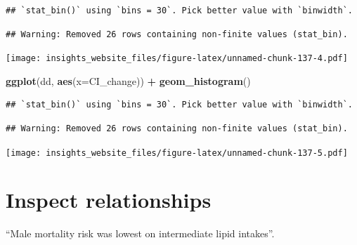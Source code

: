 \documentclass[]{book}
\newenvironment{Shaded}{\begin{snugshade}}{\end{snugshade}}
\newcommand{\DataTypeTok}[1]{\textcolor[rgb]{0.13,0.29,0.53}{#1}}
\newcommand{\DecValTok}[1]{\textcolor[rgb]{0.00,0.00,0.81}{#1}}
\newcommand{\KeywordTok}[1]{\textcolor[rgb]{0.13,0.29,0.53}{\textbf{#1}}}
\newcommand{\NormalTok}[1]{#1}
\newcommand{\OperatorTok}[1]{\textcolor[rgb]{0.81,0.36,0.00}{\textbf{#1}}}
\newcommand{\StringTok}[1]{\textcolor[rgb]{0.31,0.60,0.02}{#1}}
\begin{document}
\begin{verbatim}
## `stat_bin()` using `bins = 30`. Pick better value with `binwidth`.
\end{verbatim}

\begin{verbatim}
## Warning: Removed 26 rows containing non-finite values (stat_bin).
\end{verbatim}

\texttt{[image: insights\_website\_files/figure-latex/unnamed-chunk-137-4.pdf]}

\begin{Shaded}
\begin{Highlighting}[]
\KeywordTok{ggplot}\NormalTok{(dd, }\KeywordTok{aes}\NormalTok{(}\DataTypeTok{x=}\NormalTok{CI_change)) }\OperatorTok{+}
\StringTok{  }\KeywordTok{geom_histogram}\NormalTok{()}
\end{Highlighting}
\end{Shaded}

\begin{verbatim}
## `stat_bin()` using `bins = 30`. Pick better value with `binwidth`.
\end{verbatim}

\begin{verbatim}
## Warning: Removed 26 rows containing non-finite values (stat_bin).
\end{verbatim}

\texttt{[image: insights\_website\_files/figure-latex/unnamed-chunk-137-5.pdf]}

\begin{Shaded}
\end{Shaded}

\hypertarget{inspect-relationships}{%
\section{Inspect relationships}\label{inspect-relationships}}

``Male mortality risk was lowest on intermediate lipid intakes''.
\end{document}
